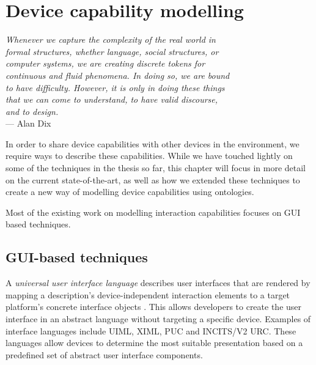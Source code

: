 \chapter{Device capability modelling}
\label{DeviceCapabilityModelling}

\begin{flushright}{\slshape    
Whenever we capture the complexity of the real world in \\
formal structures, whether language, social structures, or \\
computer systems, we are creating discrete tokens for \\
continuous and fluid phenomena. In doing so, we are bound \\
to have difficulty. However, it is only in doing these things\\
 that we can come to understand, to have valid discourse,\\
 and to design.} \\ \medskip
    ---  Alan Dix
\end{flushright}



In order to share device capabilities with other devices in the environment, we require ways to describe these capabilities. While we have touched lightly on some of the techniques in the thesis so far, this chapter will focus in more detail on the current state-of-the-art, as well as how we extended these techniques to create a new way of modelling device capabilities using ontologies.

Most of the existing work on modelling interaction capabilities focuses on \ac{GUI} based techniques. 

\section{GUI-based techniques}

A \emph{universal user interface language} describes user interfaces that are rendered by mapping a description's device-independent interaction elements to a target platform's concrete interface objects \cite{Lee2006}. This allows developers to create the user interface in an abstract language without targeting a specific device. Examples of interface languages include \ac{UIML}, \ac{XIML}, \ac{PUC} and \ac{INCITS/V2 URC}. These languages allow devices to determine the most suitable presentation based on a predefined set of abstract user interface components.

